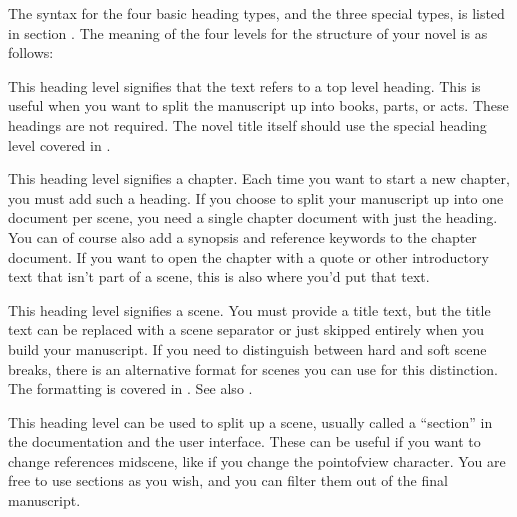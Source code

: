\documentclass[a4paper,11pt,english]{sphinxmanual}
\begin{document}
\sphinxAtStartPar
The syntax for the four basic heading types, and the three special types, is listed in section
{\hyperref[\detokenize{usage_format:a-fmt-head}]{}}. The meaning of the four levels for the structure of your novel is as follows:
\begin{description}
\sphinxAtStartPar
This heading level signifies that the text refers to a top level heading. This is useful when
you want to split the manuscript up into books, parts, or acts. These headings are not required.
The novel title itself should use the special heading level \sphinxcode{\sphinxupquote{\#!}} covered in {\hyperref[\detokenize{usage_format:a-fmt-head}]{}}.

\sphinxAtStartPar
This heading level signifies a chapter. Each time you want to start a new chapter, you must add
such a heading. If you choose to split your manuscript up into one document per scene, you need
a single chapter document with just the heading. You can of course also add a synopsis and
reference keywords to the chapter document. If you want to open the chapter with a quote or
other introductory text that isn’t part of a scene, this is also where you’d put that text.

\sphinxAtStartPar
This heading level signifies a scene. You must provide a title text, but the title text can be
replaced with a scene separator or just skipped entirely when you build your manuscript. If you
need to distinguish between hard and soft scene breaks, there is an alternative format for
scenes you can use for this distinction. The formatting is covered in {\hyperref[\detokenize{usage_format:a-fmt-head}]{}}. See
also {\hyperref[\detokenize{project_structure:a-struct-heads-scenes}]{}}.

\sphinxAtStartPar
This heading level can be used to split up a scene, usually called a “section” in the
documentation and the user interface. These can be useful if you want to change references
mid\sphinxhyphen{}scene, like if you change the point\sphinxhyphen{}of\sphinxhyphen{}view character. You are free to use sections as you
wish, and you can filter them out of the final manuscript.

\end{description}
\end{document}
